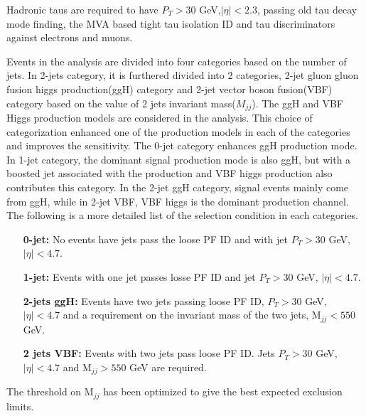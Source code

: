 Hadronic taus are required to have $P_T>30$ GeV,$|\eta|<2.3$, passing old tau decay mode finding, the MVA based tight tau isolation ID and tau discriminators against electrons and muons. %


Events in the analysis are divided into four categories based on the number of jets. In 2-jets category, it is furthered divided into 2 categories,  2-jet gluon gluon fusion higgs production(ggH) category and 2-jet vector boson fusion(VBF) category based on the value of 2 jets invariant mass($M_{jj}$). The ggH and VBF Higgs production models are considered in the analysis. This choice of categorization enhanced one of the production models in each of the categories and improves the sensitivity. The 0-jet category enhances ggH production mode. In 1-jet category, the dominant signal production mode is also ggH, but with a boosted jet associated with the production and VBF higgs production also contributes this category. In the 2-jet ggH category, signal events mainly come from ggH, while in 2-jet VBF, VBF higgs is the dominant production channel.  The following is a more detailed list of the selection condition in each categories.

\begin{enumerate}
\item[{\bf 0-jet:}] No events have jets pass the loose PF ID and  with jet $P_T>30$ GeV, $|\eta|<4.7$.
\item[{\bf 1-jet:}] Events with one jet passes losse PF ID and jet $P_T>30$ GeV, $|\eta|<4.7$.
\item [{\bf 2-jets ggH:}] Events have two jets passing loose PF ID, $P_T>30$ GeV, $|\eta|<4.7$ and a requirement on the invariant mass of the two jets, $\textrm{M}_{jj}<550$ GeV. 
\item [{\bf 2 jets VBF:}] Events with two jets pass loose PF ID. Jets $P_T>30$ GeV, $|\eta|<4.7$ and $\textrm{M}_{jj}>550$ GeV are required. 
\end{enumerate} The threshold on $\textrm{M}_{jj}$ has been optimized to give the best expected exclusion limits.


